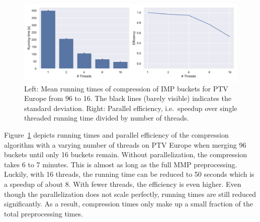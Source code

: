 \documentclass[a4paper,UKenglish,cleveref, autoref, thm-restate]{lipics-v2021}
\begin{document}
\begin{figure}
\centering
\includegraphics[width=\linewidth]{fig/parallelization.pdf}
\caption{
Left: Mean running times of compression of IMP buckets for PTV Europe from 96 to 16. The black lines (barely visible) indicates the standard deviation.
Right: Parallel efficiency, i.e.\ speedup over single threaded running time divided by number of threads.
}\label{fig:comp_par}
\end{figure}

Figure~\ref{fig:comp_par} depicts running times and parallel efficiency of the compression algorithm with a varying number of threads on PTV Europe when merging 96 buckets until only 16 buckets remain.
Without parallelization, the compression takes 6 to 7 minutes.
This is almost as long as the full MMP preprocessing.
Luckily, with 16 threads, the running time can be reduced to 50 seconds which is a speedup of about 8.
With fewer threads, the efficiency is even higher.
Even though the parallelization does not scale perfectly, running times are still reduced significantly.
As a result, compression times only make up a small fraction of the total preprocessing times.




\end{document}

